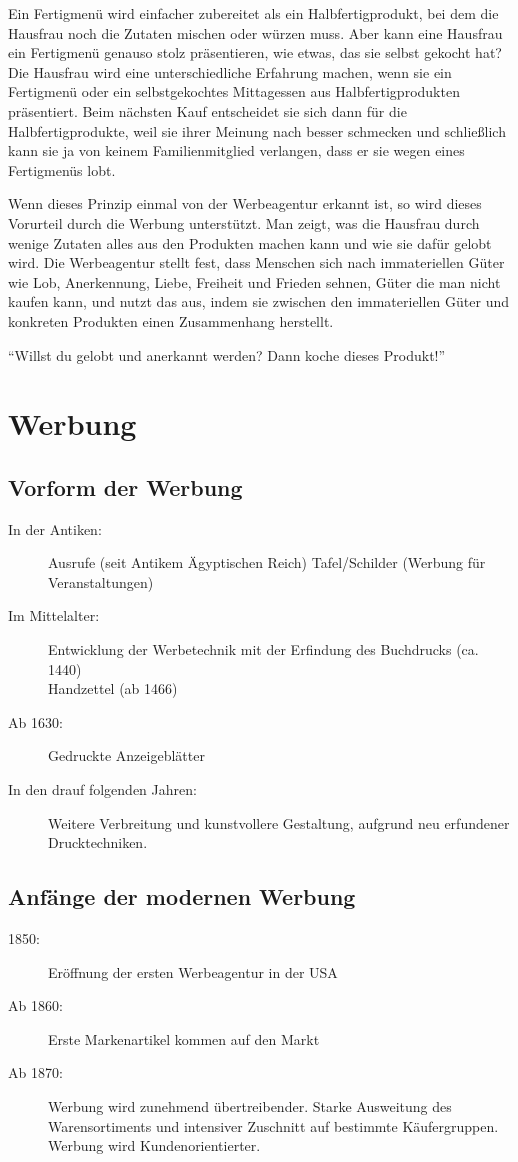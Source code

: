 \zB Ein Fertigmenü wird einfacher zubereitet als ein Halbfertigprodukt, bei dem die Hausfrau noch
die Zutaten mischen oder würzen muss. Aber kann eine Hausfrau ein Fertigmenü genauso stolz
präsentieren, wie etwas, das sie selbst gekocht hat? Die Hausfrau wird eine unterschiedliche
Erfahrung machen, wenn sie ein Fertigmenü oder ein selbstgekochtes Mittagessen aus
Halbfertigprodukten präsentiert. Beim nächsten Kauf entscheidet sie sich dann für die
Halbfertigprodukte, weil sie ihrer Meinung nach besser schmecken und schließlich kann sie ja von
keinem Familienmitglied verlangen, dass er sie wegen eines Fertigmenüs lobt.

Wenn dieses Prinzip einmal von der Werbeagentur erkannt ist, so wird dieses Vorurteil durch die
Werbung unterstützt. Man zeigt, was die Hausfrau durch wenige Zutaten alles aus den Produkten machen
kann und wie sie dafür gelobt wird. Die Werbeagentur stellt fest, dass Menschen sich nach
immateriellen Güter wie Lob, Anerkennung, Liebe, Freiheit und Frieden sehnen, Güter die man nicht
kaufen kann, und nutzt das aus, indem sie zwischen den immateriellen Güter und konkreten Produkten
einen Zusammenhang herstellt.

\enquote{Willst du gelobt und anerkannt werden? Dann koche dieses Produkt!}


\section{Werbung}
\subsection{Vorform der Werbung}

\begin{description}
	\item[In der Antiken:] Ausrufe (seit Antikem Ägyptischen Reich)
Tafel/Schilder (Werbung für Veranstaltungen)

	\item[Im Mittelalter:] Entwicklung der Werbetechnik mit der Erfindung des Buchdrucks
		(ca. 1440) \\
		Handzettel (ab 1466)

	\item[Ab 1630:] Gedruckte Anzeigeblätter
	\item[In den drauf folgenden Jahren:]
		Weitere Verbreitung und kunstvollere Gestaltung, aufgrund neu erfundener Drucktechniken.
\end{description}

\subsection{Anfänge der modernen Werbung}
\begin{description}
	\item[1850:] Eröffnung der ersten Werbeagentur in der USA
	\item[Ab 1860:] Erste Markenartikel kommen auf den Markt
	\item[Ab 1870:] Werbung wird zunehmend übertreibender.
Starke Ausweitung des Warensortiments und intensiver Zuschnitt auf bestimmte Käufergruppen.
Werbung wird Kundenorientierter.
\end{description}

